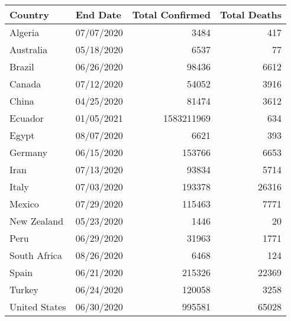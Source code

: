 \begin{tabular}{llrr}
\toprule
       Country &    End Date & Total Confirmed & Total Deaths \\
\midrule
       Algeria &  07/07/2020 &            3484 &          417 \\
     Australia &  05/18/2020 &            6537 &           77 \\
        Brazil &  06/26/2020 &           98436 &         6612 \\
        Canada &  07/12/2020 &           54052 &         3916 \\
         China &  04/25/2020 &           81474 &         3612 \\
       Ecuador &  01/05/2021 &      1583211969 &          634 \\
         Egypt &  08/07/2020 &            6621 &          393 \\
       Germany &  06/15/2020 &          153766 &         6653 \\
          Iran &  07/13/2020 &           93834 &         5714 \\
         Italy &  07/03/2020 &          193378 &        26316 \\
        Mexico &  07/29/2020 &          115463 &         7771 \\
   New Zealand &  05/23/2020 &            1446 &           20 \\
          Peru &  06/29/2020 &           31963 &         1771 \\
  South Africa &  08/26/2020 &            6468 &          124 \\
         Spain &  06/21/2020 &          215326 &        22369 \\
        Turkey &  06/24/2020 &          120058 &         3258 \\
 United States &  06/30/2020 &          995581 &        65028 \\
\bottomrule
\end{tabular}
